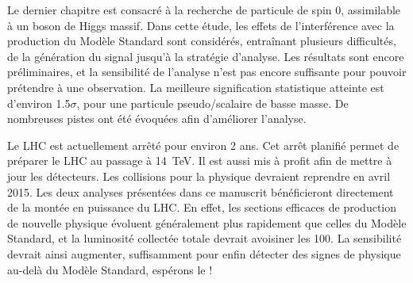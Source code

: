 \smallskip

Le dernier chapitre est consacré à la recherche de particule de spin 0, assimilable à un boson de Higgs massif. Dans cette étude, les effets de l'interférence avec la production du Modèle Standard sont considérés, entraînant plusieurs difficultés, de la génération du signal jusqu'à la stratégie d'analyse. Les résultats sont encore préliminaires, et la sensibilité de l'analyse n'est pas encore suffisante pour pouvoir prétendre à une observation. La meilleure signification statistique atteinte est d'environ \num{1.5}$\sigma$, pour une particule pseudo\-/scalaire de basse masse. De nombreuses pistes ont été évoquées afin d'améliorer l'analyse.

\bigskip

Le LHC est actuellement arrêté pour environ 2 ans. Cet arrêt planifié permet de préparer le LHC au passage à \SI{14}{\TeV}. Il est aussi mis à profit afin de mettre à jour les détecteurs. Les collisions \Pproton{}\Pproton{} pour la physique devraient reprendre en avril 2015. Les deux analyses présentées dans ce manuscrit bénéficieront directement de la montée en puissance du LHC. En effet, les sections efficaces de production de nouvelle physique évoluent généralement plus rapidement que celles du Modèle Standard, et la luminosité collectée totale devrait avoisiner les \SI{100}{\invfb}. La sensibilité devrait ainsi augmenter, suffisamment pour enfin détecter des signes de physique au-delà du Modèle Standard, espérons le !
